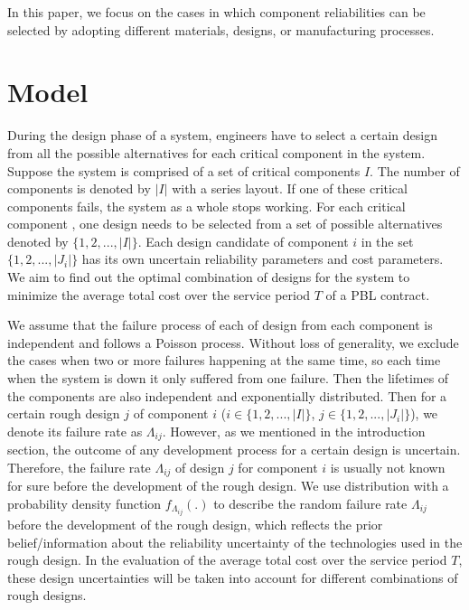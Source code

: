 \documentclass[preprint,12pt]{elsarticle}
\begin{document}
In this paper, we focus on the cases in which component reliabilities can be selected by adopting different materials, designs, or manufacturing processes.

\section{Model}
During the design phase of a system, engineers have to select a certain design from all the possible alternatives for each critical component in the system. Suppose the system is comprised of a set of critical components $I$. The number of components is denoted by $\lvert I \rvert$ with a series layout. If one of these critical components fails, the system as a whole stops working. For each critical component , one design needs to be selected from a set of possible alternatives denoted by $\{1,2,...,\lvert I \rvert \}$. Each design candidate of component $i$ in the set $\{1,2,...,\lvert J_{i}\rvert\}$ has its own uncertain reliability parameters and cost parameters. We aim to find out the optimal combination of designs for the system to minimize the average total cost over the service period $T$ of a PBL contract.

We assume that the failure process of each of design from each component is independent and follows a Poisson process. Without loss of generality, we exclude the cases when two or more failures happening at the same time, so each time when the system is down it only suffered from one failure. Then the lifetimes of the components are also independent and exponentially distributed. Then for a certain rough design $j$ of component $i$ ($i \in \{1,2,...,\lvert I \rvert\}$, $j \in \{1,2,...,\lvert J_{i} \rvert\}$), we denote its failure rate as $\Lambda_{ij}$. However, as we mentioned in the introduction section, the outcome of any development process for a certain design is uncertain. Therefore, the failure rate $\Lambda_{ij}$ of design $j$ for component $i$ is usually not known for sure before the development of the rough design. We use distribution with a probability density function $f_{\Lambda_{ij}}(.)$ to describe the random failure rate $\Lambda_{ij}$ before the development of the rough design, which reflects the prior belief/information about the reliability uncertainty of the technologies used in the rough design. In the evaluation of the average total cost over the service period $T$, these design uncertainties will be taken into account for different combinations of rough designs.
\end{document}
